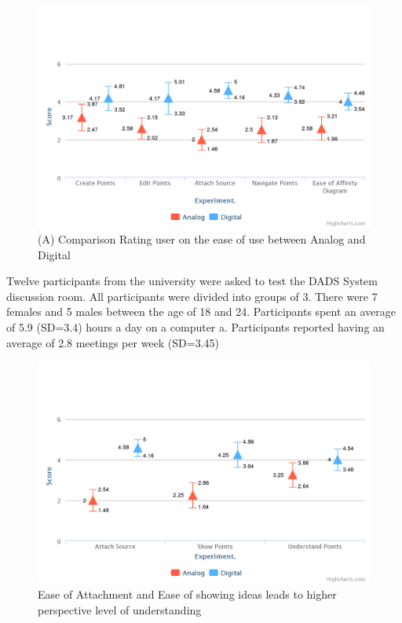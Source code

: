 \documentclass{sigchi}
\begin{document}
\begin{itemize}
\begin{itemize}
\begin{figure}[!h]
\centering
\includegraphics[width=1.1\columnwidth]{basicchart}
\caption{(A) Comparison Rating user on the ease of use between Analog and Digital}
\label{fig:figure1}
\end{figure}



 Twelve  participants from the university  were asked to test the DADS System discussion room. All participants were divided into groups of 3. There were 7 females and 5 males between the age of 18 and 24.  Participants spent an average of 5.9 (SD=3.4) hours a day on a computer a. Participants reported having an average of 2.8 meetings per week (SD=3.45)



\begin{figure}[!h]
\centering
\includegraphics[width=1.1\columnwidth]{attach}
\caption{Ease of Attachment and Ease of showing ideas leads to higher perspective level of understanding}
\label{fig:figure1}
\end{figure}




\end{itemize}
\end{itemize}
\end{document}
